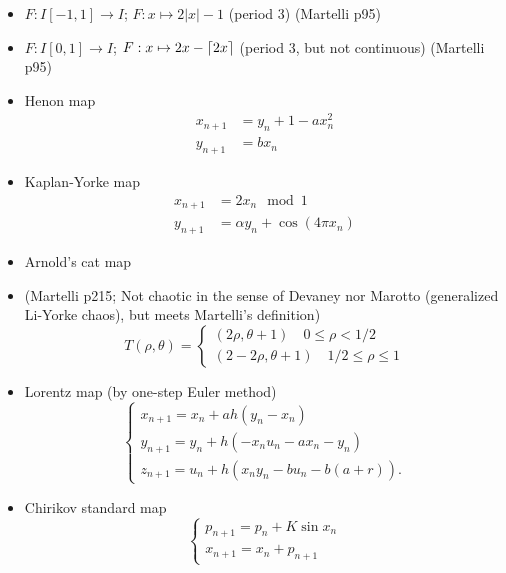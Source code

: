 \documentclass[11pt]{book}
\begin{document}
\begin{itemize}
  \item $F: I [-1,1] \to I$; $F: x \mapsto 2|x| - 1$ (period 3) (Martelli p95)
  \item $F: I [0,1] \to I$; $F: x \mapsto 2x - \left \lceil 2x \right \rceil$ (period 3, but not continuous) (Martelli p95)
  \item Henon map
    \begin{align*}
      x_{n+1} &= y_n + 1 - ax_n^2 \\
      y_{n+1} &= bx_n
    \end{align*}
  \item Kaplan-Yorke map
    \begin{align*}
      x_{n+1} &= 2x_n \mod 1    \\
      y_{n+1} &= \alpha y_n + \cos(4\pi x_n)
    \end{align*}
  \item Arnold's cat map
  \item (Martelli p215; Not chaotic in the sense of Devaney nor Marotto (generalized Li-Yorke chaos), 
    but meets Martelli's definition)
    \begin{equation*}
      T(\rho, \theta) =
      \begin{cases}
        (2\rho, \theta + 1) \quad 0\leq \rho < 1/2 \\
        (2 - 2\rho, \theta + 1) \quad 1/2 \leq \rho \leq 1
      \end{cases}
    \end{equation*}
  \item Lorentz map (by one-step Euler method)
    \begin{equation*}
      \begin{cases}
        x_{n+1} = x_n + ah(y_n - x_n) \\
        y_{n+1} = y_n + h(-x_nu_n - ax_n - y_n) \\
        z_{n+1} = u_n + h(x_ny_n - bu_n - b(a+r)).
      \end{cases}
    \end{equation*}

  \item Chirikov standard map
    \begin{equation*}
      \begin{cases}
        p_{n+1} = p_n + K\sin x_n \\
        x_{n+1} = x_n + p_{n+1}
      \end{cases}
    \end{equation*}
\end{itemize}
\end{document}

